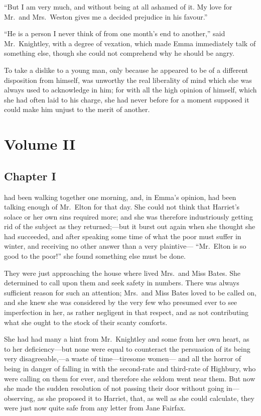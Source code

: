 ``But I am very much, and without being at all ashamed of it.
My love for Mr.\ and Mrs.\ Weston gives me a decided prejudice in
his favour.''

``He is a person I never think of from one month's end to another,''
said Mr.\ Knightley, with a degree of vexation, which made Emma
immediately talk of something else, though she could not comprehend
why he should be angry.

To take a dislike to a young man, only because he appeared to be
of a different disposition from himself, was unworthy the real
liberality of mind which she was always used to acknowledge in him;
for with all the high opinion of himself, which she had often laid
to his charge, she had never before for a moment supposed it could
make him unjust to the merit of another.




\cleartorecto
\part{Volume II}



\chapter{Chapter I}


 had been walking together one morning, and,
in Emma's opinion, had been talking enough of Mr.\ Elton for that day.
She could not think that Harriet's solace or her own sins required more;
and she was therefore industriously getting rid of the subject
as they returned;---but it burst out again when she thought she
had succeeded, and after speaking some time of what the poor must
suffer in winter, and receiving no other answer than a very plaintive---%
``Mr.\ Elton is so good to the poor!'' she found something else must be done.

They were just approaching the house where lived Mrs.\ and Miss Bates.
She determined to call upon them and seek safety in numbers.
There was always sufficient reason for such an attention; Mrs.\ and
Miss Bates loved to be called on, and she knew she was considered
by the very few who presumed ever to see imperfection in her,
as rather negligent in that respect, and as not contributing what she
ought to the stock of their scanty comforts.

She had had many a hint from Mr.\ Knightley and some from her own heart,
as to her deficiency---but none were equal to counteract the persuasion
of its being very disagreeable,---a waste of time---tiresome women---%
and all the horror of being in danger of falling in with the second-rate
and third-rate of Highbury, who were calling on them for ever,
and therefore she seldom went near them.  But now she made the sudden
resolution of not passing their door without going in---observing,
as she proposed it to Harriet, that, as well as she could calculate,
they were just now quite safe from any letter from Jane Fairfax.

